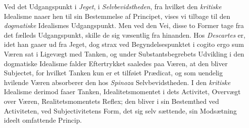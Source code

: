 Ved det Udgangspunkt i \emph{Jeget}, i \emph{Selvbevidstheden},
fra hvilket den \emph{kritiske} Idealisme naaer hen til sin Bestemmelse
af Principet, vises vi tilbage til den \emph{dogmatiske} Idealismes
Udgangspunkt. Men ved den Vei, disse to Former tage
fra det fælleds Udgangspunkt, skille de sig væsentlig fra hinanden.
Hos \emph{Descartes} er, idet han gaaer ud fra Jeget, dog
strax ved Begyndelsespunktet i cogito ergo sum Væren sat i
Ligevægt med Tanken, og under Substantsbegrebets Udvikling
i den dogmatiske Idealisme falder Eftertrykket saaledes paa
Væren, at den bliver Subjectet, for hvilket Tanken kun er et
tilføiet Prædicat, og som uendelig hvilende Væren absorberer
den hos \emph{Spinoza} Selvbevidstheden. I den \emph{kritiske} Idealisme
derimod faaer Tanken, Idealitetsmomentet i dets Activitet,
Overvægt over Væren, Realitetsmomentets Reflex; den
 \setcounter{footnote}{0}
bliver i sin Bestemthed ved Activiteten, ved Subjectivitetens
Form, det sig selv sættende, sin Modsætning ideelt omfattende
Princip.

